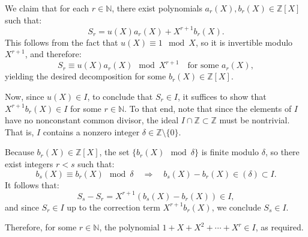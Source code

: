 \documentclass[12pt]{article}
\begin{document}
We claim that for each \( r \in \mathbb{N} \), there exist polynomials \( a_r(X), b_r(X) \in \mathbb{Z}[X] \) such that:
\[
S_r = u(X) a_r(X) + X^{r+1} b_r(X).
\]
This follows from the fact that \( u(X) \equiv 1 \mod X \), so it is invertible modulo \( X^{r+1} \), and therefore:
\[
S_r \equiv u(X) a_r(X) \mod X^{r+1} \quad \text{for some } a_r(X),
\]
yielding the desired decomposition for some \( b_r(X) \in \mathbb{Z}[X] \).

Now, since \( u(X) \in I \), to conclude that \( S_r \in I \), it suffices to show that \( X^{r+1} b_r(X) \in I \) for some \( r \in \mathbb{N} \). To that end, note that since the elements of \( I \) have no nonconstant common divisor, the ideal \( I \cap \mathbb{Z} \subset \mathbb{Z} \) must be nontrivial. That is, \( I \) contains a nonzero integer \( \delta \in \mathbb{Z} \setminus \{0\} \).

Because \( b_r(X) \in \mathbb{Z}[X] \), the set \( \{ b_r(X) \mod \delta \} \) is finite modulo \( \delta \), so there exist integers \( r < s \) such that:
\[
b_s(X) \equiv b_r(X) \mod \delta \quad \Rightarrow \quad b_s(X) - b_r(X) \in (\delta) \subset I.
\]
It follows that:
\[
S_s - S_r = X^{r+1} (b_s(X) - b_r(X)) \in I,
\]
and since \( S_r \in I \) up to the correction term \( X^{r+1} b_r(X) \), we conclude \( S_s \in I \).

Therefore, for some \( r \in \mathbb{N} \), the polynomial \( 1 + X + X^2 + \cdots + X^r \in I \), as required.
\end{document}
